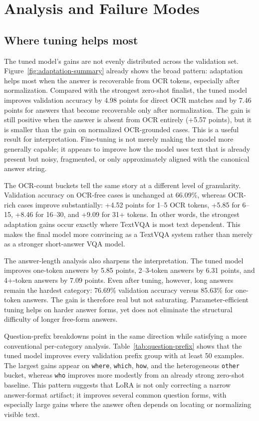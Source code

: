 \section{Analysis and Failure Modes}
\label{sec:analysis}

\subsection{Where tuning helps most}

The tuned model's gains are not evenly distributed across the validation set. Figure~\ref{fig:adaptation-summary} already shows the broad pattern: adaptation helps most when the answer is recoverable from OCR tokens, especially after normalization. Compared with the strongest zero-shot finalist, the tuned model improves validation accuracy by 4.98 points for direct OCR matches and by 7.46 points for answers that become recoverable only after normalization. The gain is still positive when the answer is absent from OCR entirely (+5.57 points), but it is smaller than the gain on normalized OCR-grounded cases. This is a useful result for interpretation. Fine-tuning is not merely making the model more generally capable; it appears to improve how the model uses text that is already present but noisy, fragmented, or only approximately aligned with the canonical answer string.

The OCR-count buckets tell the same story at a different level of granularity. Validation accuracy on OCR-free cases is unchanged at 66.09\%, whereas OCR-rich cases improve substantially: +4.52 points for 1--5 OCR tokens, +5.85 for 6--15, +8.46 for 16--30, and +9.09 for 31+ tokens. In other words, the strongest adaptation gains occur exactly where TextVQA is most text dependent. This makes the final model more convincing as a TextVQA system rather than merely as a stronger short-answer VQA model.

The answer-length analysis also sharpens the interpretation. The tuned model improves one-token answers by 5.85 points, 2--3-token answers by 6.31 points, and 4+-token answers by 7.09 points. Even after tuning, however, long answers remain the hardest category: 76.69\% validation accuracy versus 85.63\% for one-token answers. The gain is therefore real but not saturating. Parameter-efficient tuning helps on harder answer forms, yet does not eliminate the structural difficulty of longer free-form answers.

Question-prefix breakdowns point in the same direction while satisfying a more conventional per-category analysis. Table~\ref{tab:question-prefix} shows that the tuned model improves every validation prefix group with at least 50 examples. The largest gains appear on \texttt{where}, \texttt{which}, \texttt{how}, and the heterogeneous \texttt{other} bucket, whereas \texttt{who} improves more modestly from an already strong zero-shot baseline. This pattern suggests that LoRA is not only correcting a narrow answer-format artifact; it improves several common question forms, with especially large gains where the answer often depends on locating or normalizing visible text.

